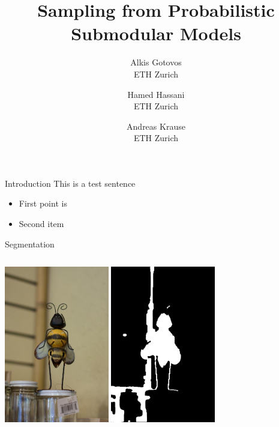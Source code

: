 \documentclass[mathserif]{beamer}
\title[Sampling from Probabilistic Submodular Models]
{Sampling from Probabilistic Submodular Models}
\author[Alkis Gotovos]{
\vspace{1in}
\normalsize
\parbox{1in}{Alkis Gotovos\\{\footnotesize ETH Zurich}}\and
\parbox{1in}{Hamed Hassani\\{\footnotesize ETH Zurich}}\and
\parbox{1in}{Andreas Krause\\{\footnotesize ETH Zurich}}
}
\begin{document}


\begin{frame}{Introduction}
This is a test sentence

\begin{itemize}
\item First point is
\item Second item
\end{itemize}
\end{frame}

\begin{frame}{Segmentation}
\begin{columns}[c]
\centering
\includegraphics[width=1.8in]{figures/bee.jpg}
\centering
\includegraphics[width=1.8in]{figures/bee_fbp1.png}
\end{columns}
\end{frame}
\end{document}
